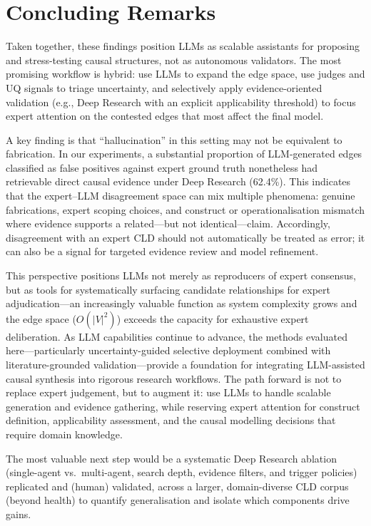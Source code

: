 \section{Concluding Remarks}
\label{sec:conclusion_remarks}

Taken together, these findings position LLMs as scalable assistants for proposing and stress-testing causal structures, not as autonomous validators. The most promising workflow is hybrid: use LLMs to expand the edge space, use judges and UQ signals to triage uncertainty, and selectively apply evidence-oriented validation (e.g., Deep Research with an explicit applicability threshold) to focus expert attention on the contested edges that most affect the final model.

A key finding is that ``hallucination'' in this setting may not be equivalent to fabrication. In our experiments, a substantial proportion of LLM-generated edges classified as false positives against expert ground truth nonetheless had retrievable direct causal evidence under Deep Research (62.4\%). This indicates that the expert--LLM disagreement space can mix multiple phenomena: genuine fabrications, expert scoping choices, and construct or operationalisation mismatch where evidence supports a related---but not identical---claim. Accordingly, disagreement with an expert CLD should not automatically be treated as error; it can also be a signal for targeted evidence review and model refinement.

This perspective positions LLMs not merely as reproducers of expert consensus, but as tools for systematically surfacing candidate relationships for expert adjudication---an increasingly valuable function as system complexity grows and the edge space ($O(|V|^2)$) exceeds the capacity for exhaustive expert deliberation. As LLM capabilities continue to advance, the methods evaluated here---particularly uncertainty-guided selective deployment combined with literature-grounded validation---provide a foundation for integrating LLM-assisted causal synthesis into rigorous research workflows. The path forward is not to replace expert judgement, but to augment it: use LLMs to handle scalable generation and evidence gathering, while reserving expert attention for construct definition, applicability assessment, and the causal modelling decisions that require domain knowledge.

The most valuable next step would be a systematic Deep Research ablation (single-agent vs.\ multi-agent, search depth, evidence filters, and trigger policies) replicated and (human) validated, across a larger, domain-diverse CLD corpus (beyond health) to quantify generalisation and isolate which components drive gains.








